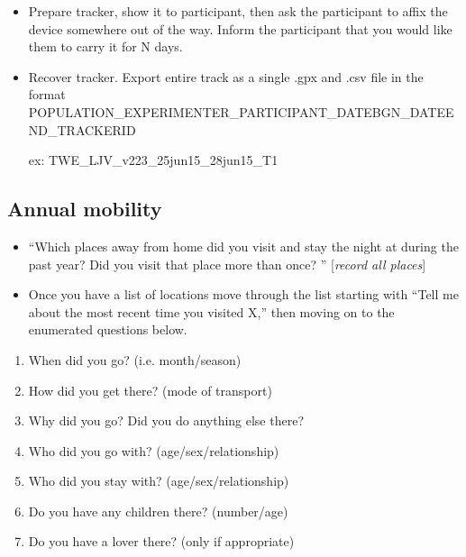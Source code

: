 \documentclass{article}
\begin{document}
\begin{itemize}
\item Prepare tracker, show it to participant, then ask the participant to affix the device somewhere out of the way.  Inform the participant that you would like them to carry it for N days.

\item Recover tracker. Export entire track as a single .gpx and .csv file in the format POPULATION\_EXPERIMENTER\_PARTICIPANT\_DATEBGN\_DATEEND\_TRACKERID  

ex: TWE\_LJV\_v223\_25jun15\_28jun15\_T1

\end{itemize}


\subsection{Annual mobility}

\begin{itemize}

\item ``Which places away from home did you visit and stay the night at during the past year? Did you visit that place more than once? '' [\emph{record all places}]

\item Once you have a list of locations move through the list starting with ``Tell me about the most recent time you visited X,'' then moving on to the enumerated questions below.

\end{itemize}

\begin{enumerate}
\item When did you go? (i.e. month/season)

\item How did you get there? (mode of transport)

\item Why did you go? Did you do anything else there?

\item Who did you go with? (age/sex/relationship)

\item Who did you stay with? (age/sex/relationship)

\item Do you have any children there? (number/age)

\item Do you have a lover there? (only if appropriate)

\end{enumerate}
\end{document}
